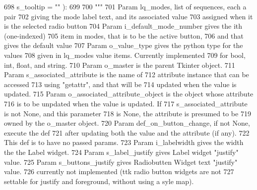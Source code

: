 \begin{DoxyCode}
698             s\_tooltip = \textcolor{stringliteral}{""} ):
699 
700         \textcolor{stringliteral}{"""}
701 \textcolor{stringliteral}{        Param lq\_modes, list of sequences, each a pair}
702 \textcolor{stringliteral}{            giving the mode label text, and its associated value}
703 \textcolor{stringliteral}{            assigned when it is the selected radio button}
704 \textcolor{stringliteral}{        Param i\_default\_mode\_number gives the ith (one-indexed)}
705 \textcolor{stringliteral}{            item in modes, that is to be the active button,}
706 \textcolor{stringliteral}{            and that gives the default value}
707 \textcolor{stringliteral}{        Param o\_value\_type gives the python type for the values}
708 \textcolor{stringliteral}{            given in lq\_modes value items.  Currently implemented}
709 \textcolor{stringliteral}{            for bool, int, float, and string.}
710 \textcolor{stringliteral}{        Param o\_master is the parent Tkinter object.}
711 \textcolor{stringliteral}{                Param s\_associated\_attribute is the name of }
712 \textcolor{stringliteral}{            attribute instance that can be accessed}
713 \textcolor{stringliteral}{            using "getattr", and that will be}
714 \textcolor{stringliteral}{            updated when the value is updated.}
715 \textcolor{stringliteral}{        Param o\_associated\_attribute\_object is the object whose attribute}
716 \textcolor{stringliteral}{            is to be unpdated when the value is updated.  If}
717 \textcolor{stringliteral}{            s\_associated\_attribute is not None, and this parameter}
718 \textcolor{stringliteral}{            is None, the attribute is presumed to be}
719 \textcolor{stringliteral}{            owned by the o\_master object.}
720 \textcolor{stringliteral}{        Param def\_on\_button\_change, if not None, execute the def}
721 \textcolor{stringliteral}{            after updating both the value and the attribute (if any).}
722 \textcolor{stringliteral}{            This def is to have no passed params.}
723 \textcolor{stringliteral}{        Param i\_labelwidth gives the width the the Label widget.}
724 \textcolor{stringliteral}{        Param s\_label\_justify gives Label widget "justify" value.}
725 \textcolor{stringliteral}{        Param s\_buttons\_justify gives Radiobutten Widget text "justify" value.}
726 \textcolor{stringliteral}{                currently not implemented (ttk radio button widgets are not}
727 \textcolor{stringliteral}{                settable for justify and foreground, without using a syle map).}

\end{DoxyCode}
